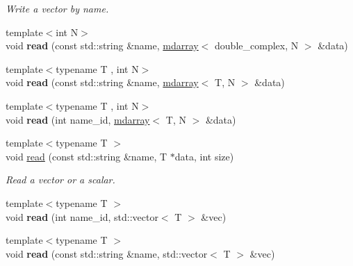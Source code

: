 \begin{DoxyCompactItemize}
\begin{DoxyCompactList}\small\item\em Write a vector by name. \end{DoxyCompactList}\item 
\hypertarget{classsirius_1_1_h_d_f5__tree_ade9445a7679b2e330597785e74096f3c}{}{\footnotesize template$<$int N$>$ }\\void {\bfseries read} (const std\+::string \&name, \hyperlink{classsddk_1_1mdarray}{mdarray}$<$ double\+\_\+complex, N $>$ \&data)\label{classsirius_1_1_h_d_f5__tree_ade9445a7679b2e330597785e74096f3c}

\item 
\hypertarget{classsirius_1_1_h_d_f5__tree_afee4409bbb5f1fddd8b874389acba74a}{}{\footnotesize template$<$typename T , int N$>$ }\\void {\bfseries read} (const std\+::string \&name, \hyperlink{classsddk_1_1mdarray}{mdarray}$<$ T, N $>$ \&data)\label{classsirius_1_1_h_d_f5__tree_afee4409bbb5f1fddd8b874389acba74a}

\item 
\hypertarget{classsirius_1_1_h_d_f5__tree_ab2f7c6cccaac2d56e9a4aa560830b11a}{}{\footnotesize template$<$typename T , int N$>$ }\\void {\bfseries read} (int name\+\_\+id, \hyperlink{classsddk_1_1mdarray}{mdarray}$<$ T, N $>$ \&data)\label{classsirius_1_1_h_d_f5__tree_ab2f7c6cccaac2d56e9a4aa560830b11a}

\item 
{\footnotesize template$<$typename T $>$ }\\void \hyperlink{classsirius_1_1_h_d_f5__tree_a355104908164356ae9368fc20f12993c}{read} (const std\+::string \&name, T $\ast$data, int size)
\begin{DoxyCompactList}\small\item\em Read a vector or a scalar. \end{DoxyCompactList}\item 
\hypertarget{classsirius_1_1_h_d_f5__tree_ab39a224907fcff7ba5a3b04f88598535}{}{\footnotesize template$<$typename T $>$ }\\void {\bfseries read} (int name\+\_\+id, std\+::vector$<$ T $>$ \&vec)\label{classsirius_1_1_h_d_f5__tree_ab39a224907fcff7ba5a3b04f88598535}

\item 
\hypertarget{classsirius_1_1_h_d_f5__tree_aeb32ef9eed78c00c732867bb0ccf89b3}{}{\footnotesize template$<$typename T $>$ }\\void {\bfseries read} (const std\+::string \&name, std\+::vector$<$ T $>$ \&vec)\label{classsirius_1_1_h_d_f5__tree_aeb32ef9eed78c00c732867bb0ccf89b3}


\end{DoxyCompactItemize}
